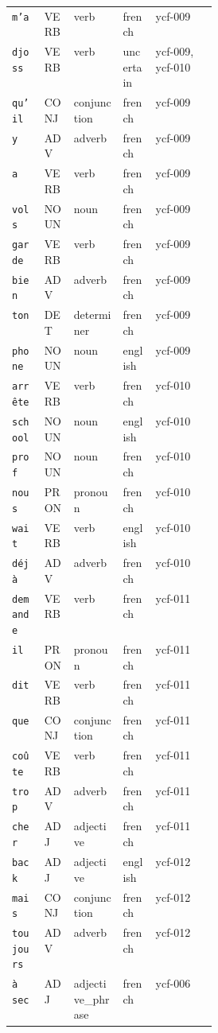 \begin{longtable}{@{}llll p{0.30\linewidth}@{}}
\texttt{m'a} & VERB & verb & french & \small ycf-009 \\
\texttt{djoss} & VERB & verb & uncertain & \small ycf-009, ycf-010 \\
\texttt{qu'il} & CONJ & conjunction & french & \small ycf-009 \\
\texttt{y} & ADV & adverb & french & \small ycf-009 \\
\texttt{a} & VERB & verb & french & \small ycf-009 \\
\texttt{vols} & NOUN & noun & french & \small ycf-009 \\
\texttt{garde} & VERB & verb & french & \small ycf-009 \\
\texttt{bien} & ADV & adverb & french & \small ycf-009 \\
\texttt{ton} & DET & determiner & french & \small ycf-009 \\
\texttt{phone} & NOUN & noun & english & \small ycf-009 \\
\texttt{arrête} & VERB & verb & french & \small ycf-010 \\
\texttt{school} & NOUN & noun & english & \small ycf-010 \\
\texttt{prof} & NOUN & noun & french & \small ycf-010 \\
\texttt{nous} & PRON & pronoun & french & \small ycf-010 \\
\texttt{wait} & VERB & verb & english & \small ycf-010 \\
\texttt{déjà} & ADV & adverb & french & \small ycf-010 \\
\texttt{demande} & VERB & verb & french & \small ycf-011 \\
\texttt{il} & PRON & pronoun & french & \small ycf-011 \\
\texttt{dit} & VERB & verb & french & \small ycf-011 \\
\texttt{que} & CONJ & conjunction & french & \small ycf-011 \\
\texttt{coûte} & VERB & verb & french & \small ycf-011 \\
\texttt{trop} & ADV & adverb & french & \small ycf-011 \\
\texttt{cher} & ADJ & adjective & french & \small ycf-011 \\
\texttt{back} & ADJ & adjective & english & \small ycf-012 \\
\texttt{mais} & CONJ & conjunction & french & \small ycf-012 \\
\texttt{toujours} & ADV & adverb & french & \small ycf-012 \\
\texttt{à sec} & ADJ & adjective\_phrase & french & \small ycf-006 \\

\end{longtable}
